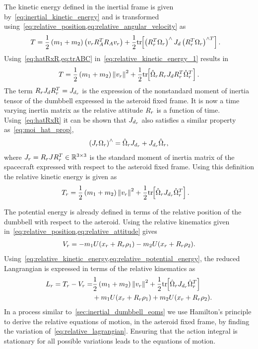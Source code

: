 The kinetic energy defined in the inertial frame is given by~\cref{eq:inertial_kinetic_energy} and is transformed using~\cref{eq:relative_position,eq:relative_angular_velocity} as
\begin{align}\label{eq:relative_kinetic_energy_1}
    T &= \frac{1}{2} \left( m_1 + m_2 \right) \left( v_r R_A^T R_A v_r \right) + \frac{1}{2} \mathrm{tr}\negthickspace\left[ \left( R_r^T \Omega_r \right)^\wedge J_d \left( R_r^T \Omega_r  \right)^{\wedge T} \right]. 
\end{align}
Using~\cref{eq:hatRxR,eq:trABC} in~\cref{eq:relative_kinetic_energy_1} results in
\begin{align}\label{eq:relative_kinetic_energy_2}
    T = \frac{1}{2} \left( m_1 + m_2 \right) \left\| v_r \right\|^2 + \frac{1}{2} \mathrm{tr}\negthickspace\left[ \hat{\Omega}_r R_r J_d R_r^T \hat{\Omega}_r^T \right].
\end{align}
The term \( R_r J_d R_r^T = J_{d_r}\) is the expression of the nonstandard moment of inertia tensor of the dumbbell expressed in the asteroid fixed frame. 
It is now a time varying inertia matrix as the relative attitude \( R_r \) is a function of time.
Using~\cref{eq:hatRxR} it can be shown that \( J_{d_r} \) also satisfies a similar property as~\cref{eq:moi_hat_prop}, 
\begin{align}\label{eq:moi_relative_hat_prop}
    \left( J_r \Omega_r \right)^\wedge = \hat{\Omega}_r J_{d_r} + J_{d_r}\hat{\Omega}_r,
\end{align}
where \( J_r = R_r J R_r^T \in \mathbb{R}^{3 \times 3}\) is the standard moment of inertia matrix of the spacecraft expressed with respect to the asteroid fixed frame.
Using this definition the relative kinetic energy is given as
\begin{align}\label{eq:relative_kinetic_energy}
    T_r &= \frac{1}{2} \left( m_1 + m_2 \right) \left\| v_r \right\|^2 + \frac{1}{2} \mathrm{tr}\negthickspace\left[ \hat{\Omega}_r J_{d_r} \hat{\Omega}_r^T \right].
\end{align}

The potential energy is already defined in terms of the relative position of the dumbbell with respect to the asteroid.
Using the relative kinematics given in~\cref{eq:relative_position,eq:relative_attitude} gives
\begin{align}\label{eq:relative_potential_energy}
    V_r = -m_1 U( x_r + R_r \rho_1) - m_2 U(x_r + R_r \rho_2).
\end{align}
Using~\cref{eq:relative_kinetic_energy,eq:relative_potential_energy}, the reduced Langrangian is expressed in terms of the relative kinematics as 
\begin{align}\label{eq:relative_lagrangian}
    L_r = T_r-V_r =& \frac{1}{2} \left( m_1 + m_2 \right) \left\| v_r \right\|^2 + \frac{1}{2} \mathrm{tr}\negthickspace\left[ \hat{\Omega}_r J_{d_r} \hat{\Omega}_r^T \right] \nonumber \\
             &+m_1 U(x_r + R_r \rho_1) + m_2 U(x_r + R_r \rho_2) .
\end{align}
In a process similar to~\cref{sec:inertial_dumbbell_eoms} we use Hamilton's principle to derive the relative equations of motion, in the asteroid fixed frame, by finding the variation of~\cref{eq:relative_lagrangian}.
Ensuring that the action integral is stationary for all possible variations leads to the equations of motion.

